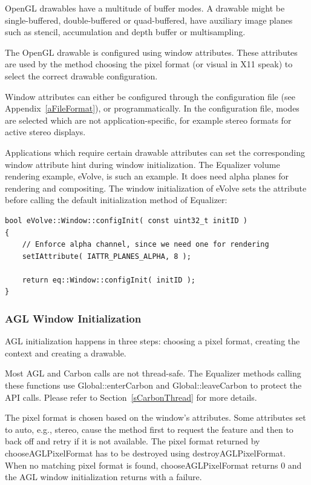 \documentclass[10pt,a4]{scrartcl}
\newcommand{\sref}[1]{Section~\ref{#1}}
\newcommand{\aref}[1]{Appendix~\ref{#1}}
\begin{document}
OpenGL drawables have a multitude of buffer modes. A drawable might be
single-buffered, double-buffered or quad-buffered, have auxiliary image
planes such as stencil, accumulation and depth buffer or multisampling.

The OpenGL drawable is configured using window attributes. These
attributes are used by the method choosing the pixel format (or visual
in X11 speak) to select the correct drawable configuration.

Window attributes can either be configured through the configuration
file (see \aref{aFileFormat}), or programmatically. In the configuration
file, modes are selected which are not application-specific, for example
stereo formats for active stereo displays. 

Applications which require certain drawable attributes can set the
corresponding window attribute hint during window initialization. The
Equalizer volume rendering example, \textsf{eVolve}, is such an
example. It does need alpha planes for rendering and compositing. The
window initialization of \textsf{eVolve} sets the attribute before
calling the default initialization method of Equalizer:

{\footnotesize\begin{lstlisting}
bool eVolve::Window::configInit( const uint32_t initID )
{
    // Enforce alpha channel, since we need one for rendering
    setIAttribute( IATTR_PLANES_ALPHA, 8 );

    return eq::Window::configInit( initID );
}
\end{lstlisting}}


\subsubsection{AGL Window Initialization}

AGL initialization happens in three steps: choosing a pixel format,
creating the context and creating a drawable. 

Most AGL and Carbon calls are not thread-safe. The Equalizer methods
calling these functions use \textsf{Global::enterCarbon} and
\textsf{Global::leaveCarbon} to protect the API calls. Please refer to
\sref{sCarbonThread} for more details.

The pixel format is chosen based on the window's attributes. Some
attributes set to auto, e.g., stereo, cause the method first to request
the feature and then to back off and retry if it is not available. The
pixel format returned by \textsf{chooseAGLPixelFormat} has to be
destroyed using \textsf{destroyAGLPixelFormat}. When no matching pixel
format is found, \textsf{chooseAGLPixelFormat} returns \textsf{0} and
the AGL window initialization returns with a failure.
\end{document}
